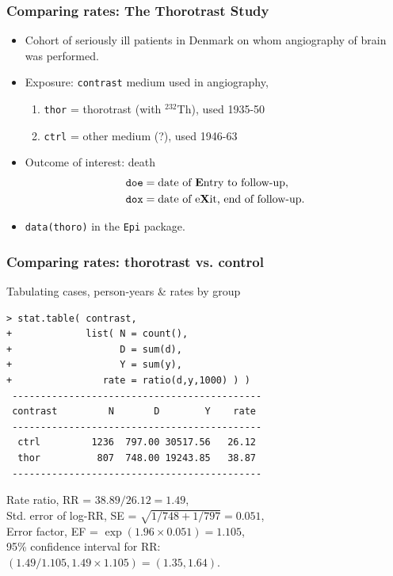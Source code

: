\documentclass[handout,12pt,dvipsnames,t]{beamer}
\begin{document}
\begin{frame}[fragile]
\frametitle{Comparing rates: The Thorotrast Study}
\begin{itemize}
\item
Cohort of seriously ill patients in Denmark
on whom angiography of brain was performed.
\vspace{\medskipamount}
\item
Exposure: {\tt contrast} medium used in angiography,
\begin{enumerate}
\item {\tt thor} = thorotrast (with $^{232}$Th), used 1935-50
\item {\tt ctrl} = other medium (?), used 1946-63
\end{enumerate}
\item
Outcome of interest: death
  \begin{align*}
    \texttt{doe} & = \text{date of {\bf E}ntry to follow-up}, \\
    \texttt{dox} & = \text{date of e{\bf X}it, end of follow-up}.
  \end{align*}
\item {\tt data(thoro)} in the {\tt Epi} package.
\end{itemize}
\end{frame}

\begin{frame}[fragile]
\frametitle{Comparing rates: thorotrast vs. control}
Tabulating cases, person-years \& rates by group

\lstset{basicstyle=\footnotesize}
\begin{lstlisting}
> stat.table( contrast,
+             list( N = count(),
+                   D = sum(d),
+                   Y = sum(y),
+                rate = ratio(d,y,1000) ) )
 --------------------------------------------
 contrast         N       D        Y    rate
 --------------------------------------------
  ctrl         1236  797.00 30517.56   26.12
  thor          807  748.00 19243.85   38.87
 --------------------------------------------
\end{lstlisting}
\normalsize
Rate ratio, RR = $38.89/26.12 = 1.49$, \\
Std. error of log-RR, SE  = $\sqrt{1/748 + 1/797} = 0.051$, \\
Error factor, EF = $\exp(1.96 \times 0.051) = 1.105$, \\
95\% confidence interval for RR:\\
$(1.49/1.105, 1.49\times 1.105) =
 (1.35, 1.64)$.
\end{frame}
\end{document}
